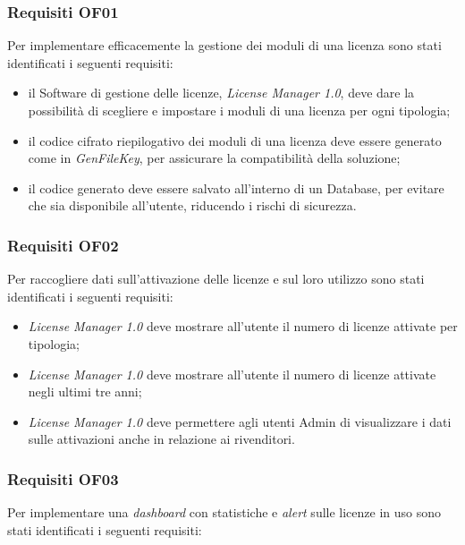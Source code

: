 \subsubsection{Requisiti OF01}

Per implementare efficacemente la gestione dei moduli di una licenza sono stati identificati i seguenti requisiti:

\begin{itemize}
\item il Software di gestione delle licenze, \textit{License Manager 1.0}, deve dare la possibilità di scegliere e impostare i moduli di una licenza per ogni tipologia;
\item il codice cifrato riepilogativo dei moduli di una licenza deve essere generato come in \textit{GenFileKey}, per assicurare la compatibilità della soluzione;
\item il codice generato deve essere salvato all'interno di un Database, per evitare che sia disponibile all'utente, riducendo i rischi di sicurezza.

\end{itemize}

\subsubsection{Requisiti OF02}

Per raccogliere dati sull'attivazione delle licenze e sul loro utilizzo sono stati identificati i seguenti requisiti:

\begin{itemize}
\item \textit{License Manager 1.0} deve mostrare all'utente il numero di licenze attivate per tipologia;
\item \textit{License Manager 1.0} deve mostrare all'utente il numero di licenze attivate negli ultimi tre anni;
\item \textit{License Manager 1.0} deve permettere agli utenti Admin di visualizzare i dati sulle attivazioni anche in relazione ai rivenditori.
\end{itemize}


\subsubsection{Requisiti OF03}

Per implementare una \textit{dashboard} con statistiche e \textit{alert} sulle licenze in uso sono stati identificati i seguenti requisiti:

